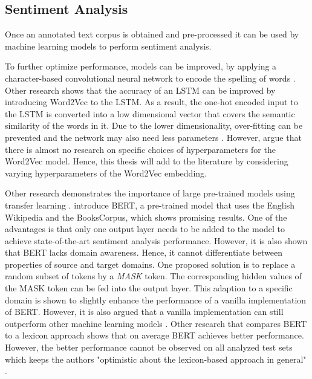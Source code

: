 \documentclass[11pt, a4paper]{article}
\begin{document}
\subsection{Sentiment Analysis}
Once an annotated text corpus is obtained and pre-processed it can be used by machine learning models to perform sentiment analysis.

To further optimize performance, models can be improved, by applying a character-based 
convolutional neural network to encode the spelling of words \citep{pei2019slang}. Other research shows that the accuracy of an
LSTM can be improved by introducing Word2Vec to the LSTM. As a result, the one-hot encoded input to the LSTM is
converted into a low dimensional vector that covers the semantic similarity of the words in it. Due to the lower dimensionality,
over-fitting can be prevented and the network may also need less parameters \citep{xiao2018word2veclstm}. However, \cite{giovanni2021word2vec}
argue that there is almost no research on specific choices of hyperparameters for the Word2Vec model. Hence, this thesis will add to the literature
by considering varying hyperparameters of the Word2Vec embedding.

Other research demonstrates the importance of large pre-trained models using transfer learning \citep{deng2009transferlearning}.
\cite{devlin2019bert} introduce BERT, a pre-trained model that uses the English Wikipedia and the BooksCorpus, which shows promising results.
One of the advantages is that only one output layer needs to be added to the model to achieve state-of-the-art sentiment analysis performance.
However, it is also shown that BERT lacks domain awareness. Hence, it cannot differentiate between properties of source and target domains. One
proposed solution is to replace a random subset of tokens by a \emph{MASK} token. The corresponding hidden values of the MASK token can be fed
into the output layer. This adaption to a specific domain is shown to slightly enhance the performance of a vanilla implementation of BERT. However,
it is also argued that a vanilla implementation can still outperform other machine learning models \citep{Du2020AdversarialAD}. Other research that compares BERT to a
lexicon approach shows that on average BERT achieves better performance. However, the better performance cannot be observed on all analyzed test sets
which keeps the authors "optimistic about the lexicon-based approach in general" \citep{kotelnikova2021lexiconbased}. %
\end{document}
